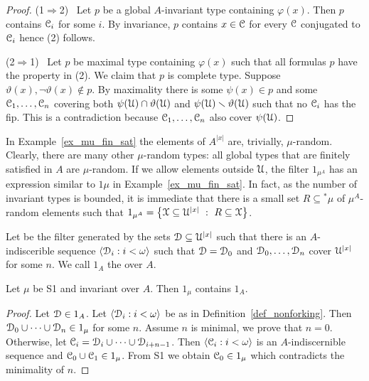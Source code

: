 \documentclass{amsproc}
\renewcommand*{\emph}[1]{%
   \smash{\tikz[baseline]\node[rectangle, fill=teal!25, rounded corners, inner xsep=0.5ex, inner ysep=0.2ex, anchor=base, minimum height = 2.7ex]{\strut #1};}}
\begin{document}
\begin{proof}
  (1$\Rightarrow$2) \ Let $p$ be a global $A$-invariant type containing $\varphi(x)$.
  Then $p$ contains $\EuScript C_i$ for some $i$.
  By invariance, $p$ contains $x\in\EuScript C$ for every $\EuScript C$ conjugated to $\EuScript C_i$ hence (2) follows.

  (2$\Rightarrow$1) \ Let $p$ be maximal type containing $\varphi(x)$ such that all formulas $p$ have the property in (2).
  We claim that $p$ is complete type.
  Suppose $\vartheta(x),\neg\vartheta(x)\notin p$.
  By maximality there is some $\psi(x)\in p$ and some $\EuScript C_1,\dots,\EuScript C_n$ covering both $\psi(\EuScript U)\cap\vartheta(\EuScript U)$ and $\psi(\EuScript U)\smallsetminus\vartheta(\EuScript U)$ such that no $\EuScript C_i$ has the fip.
  This is a contradiction because $\EuScript C_1,\dots,\EuScript C_n$ also cover $\psi(\EuScript U)$.
\end{proof}

In Example~\ref{ex_mu_fin_sat} the elements of $A^{|x|}$ are, trivially, $\mu$-random.
Clearly, there are many other $\mu$-random types: all global types that are finitely satisfied in $A$ are $\mu$-random.
If we allow elements outside $\EuScript U$, the filter $1_{\mu^A}$ has an expression similar to $1\mu$ in Example~\ref{ex_mu_fin_sat}.
In fact, as the number of invariant types is bounded, it is immediate that there is a small set $R\subseteq{}^*\!\!\mu$ of $\mu^A$-random elements such that $1_{\mu^A}=\big\{\EuScript X\subseteq\EuScript U^{|x|}\ :\ R\subseteq\EuScript X\big\}$.

\begin{definition}\label{def_nonforking}
  Let \emph{$1_A$\/} be the filter generated by the sets $\EuScript D\subseteq\EuScript U^{|x|}$ such that there is an $A$-indiscerible sequence $\langle \EuScript D_i:i<\omega\rangle$ such that $\EuScript D=\EuScript D_0$ and $\EuScript D_0,\dots,\EuScript D_n$ cover $\EuScript U^{|x|}$ for some $n$.
  We call $1_A$ the \emph{nonforking filter\/} over $A$.
\end{definition}

\begin{fact}
  Let $\mu$ be S1 and invariant over $A$.
  Then $1_\mu$ contains $1_A$.
\end{fact}

\begin{proof}
  Let $\EuScript D\in 1_A$. 
  Let $\langle \EuScript D_i:i<\omega\rangle$ be as in Definition~\ref{def_nonforking}.
  Then $\EuScript D_0\cup\dots\cup\EuScript D_n\in1_\mu$ for some $n$.
  Assume $n$ is minimal, we prove that $n=0$.
  Otherwise, let $\EuScript C_i=\EuScript D_i\cup\dots\cup\EuScript D_{i+n-1}$.
  Then $\langle \EuScript C_i:i<\omega\rangle$ is an $A$-indiscernible sequence and $\EuScript C_0\cup\EuScript C_1\in1_\mu$.
  From S1 we obtain $\EuScript C_0\in1_\mu$ which contradicts the minimality of $n$.
\end{proof}
\end{document}
